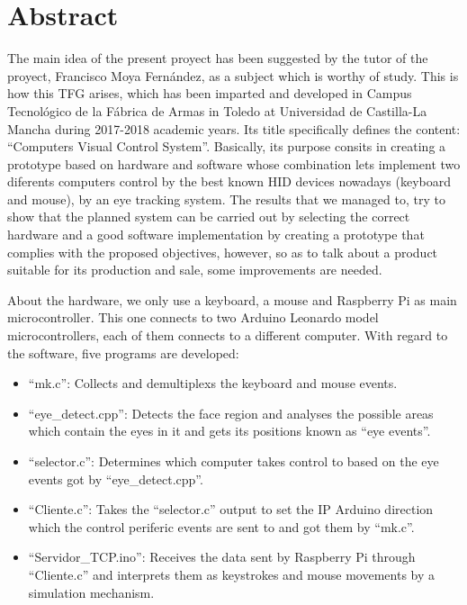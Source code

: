 \newpage
\chapter*{Abstract} \label{abstract}
\pagestyle{empty}
\thispagestyle{empty} 

The main idea of the present proyect has been suggested by the tutor of the proyect, Francisco Moya Fernández, as a subject which is worthy of study. This is how this TFG arises, which has been imparted and developed in Campus Tecnológico de la Fábrica de Armas in Toledo at Universidad de Castilla-La Mancha during 2017-2018 academic years. Its title specifically defines the content: ``Computers Visual Control System''. Basically, its purpose consits in creating a prototype based on hardware and software whose combination lets implement two diferents computers control by the best known HID devices nowadays (keyboard and mouse), by an eye tracking system. The results that we managed to, try to show that the planned system can be carried out by selecting the correct hardware and a good software implementation by creating a prototype that complies with the proposed objectives, however, so as to talk about a product suitable for its production and sale, some improvements are needed.

About the hardware, we only use a keyboard, a mouse and Raspberry Pi as main microcontroller. This one connects to two Arduino Leonardo model microcontrollers, each of them connects to a different computer. With regard to the software, five programs are developed:

\begin{itemize}
    \item ``mk.c'': Collects and demultiplexs the keyboard and mouse events.
    \item ``eye\_detect.cpp'': Detects the face region and analyses the possible areas which contain the eyes in it and gets its positions known as ``eye events''.
    \item ``selector.c'': Determines which computer takes control to based on the eye events got by ``eye\_detect.cpp''.
    \item ``Cliente.c'': Takes the ``selector.c'' output to set the IP Arduino direction which the control periferic events are sent to and got them by ``mk.c''.
    \item ``Servidor\_TCP.ino'': Receives the data sent by Raspberry Pi through ``Cliente.c'' and interprets them as keystrokes and mouse movements by a simulation mechanism.
\end{itemize}